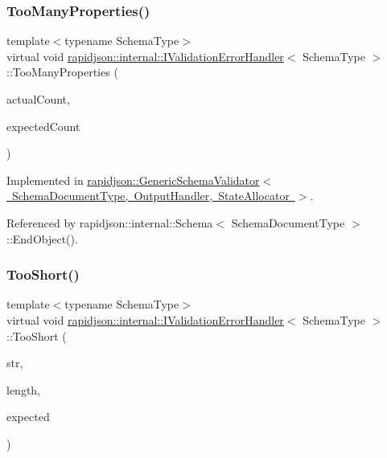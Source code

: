 \subsubsection{\texorpdfstring{TooManyProperties()}{TooManyProperties()}}
{\footnotesize\ttfamily template$<$typename Schema\+Type$>$ \\
virtual void \mbox{\hyperlink{classrapidjson_1_1internal_1_1_i_validation_error_handler}{rapidjson\+::internal\+::\+I\+Validation\+Error\+Handler}}$<$ Schema\+Type $>$\+::Too\+Many\+Properties (\begin{DoxyParamCaption}\item[{\mbox{\hyperlink{namespacerapidjson_a44eb33eaa523e36d466b1ced64b85c84}{Size\+Type}}}]{actual\+Count,  }\item[{\mbox{\hyperlink{namespacerapidjson_a44eb33eaa523e36d466b1ced64b85c84}{Size\+Type}}}]{expected\+Count }\end{DoxyParamCaption})\hspace{0.3cm}{\ttfamily [pure virtual]}}



Implemented in \mbox{\hyperlink{classrapidjson_1_1_generic_schema_validator_acbaaa6d63ebdd11b8526fe4c7d6ba3cf}{rapidjson\+::\+Generic\+Schema\+Validator$<$ Schema\+Document\+Type, Output\+Handler, State\+Allocator $>$}}.



Referenced by rapidjson\+::internal\+::\+Schema$<$ Schema\+Document\+Type $>$\+::\+End\+Object().

\mbox{\label{classrapidjson_1_1internal_1_1_i_validation_error_handler_af13eb2448c9606f58af8cecc009bea85}} 
\subsubsection{\texorpdfstring{TooShort()}{TooShort()}}
{\footnotesize\ttfamily template$<$typename Schema\+Type$>$ \\
virtual void \mbox{\hyperlink{classrapidjson_1_1internal_1_1_i_validation_error_handler}{rapidjson\+::internal\+::\+I\+Validation\+Error\+Handler}}$<$ Schema\+Type $>$\+::Too\+Short (\begin{DoxyParamCaption}\item[{const \mbox{\hyperlink{classrapidjson_1_1internal_1_1_i_validation_error_handler_a02c672a313401138fd08504062f3d1d0}{Ch}} $\ast$}]{str,  }\item[{\mbox{\hyperlink{namespacerapidjson_a44eb33eaa523e36d466b1ced64b85c84}{Size\+Type}}}]{length,  }\item[{\mbox{\hyperlink{namespacerapidjson_a44eb33eaa523e36d466b1ced64b85c84}{Size\+Type}}}]{expected }\end{DoxyParamCaption})\hspace{0.3cm}{\ttfamily [pure virtual]}}



